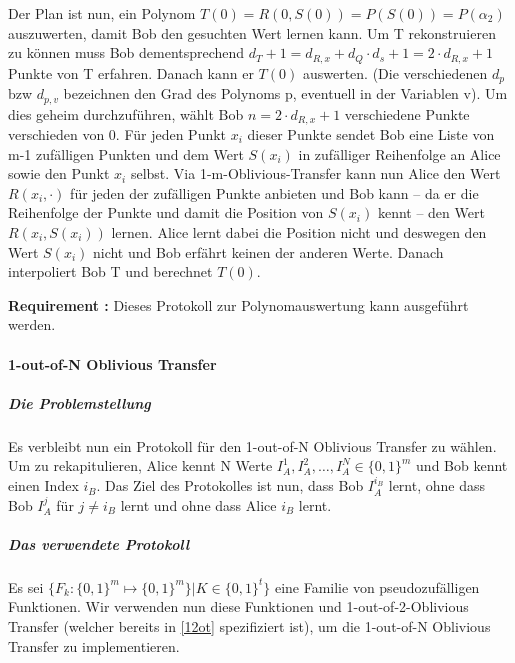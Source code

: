 \documentclass{article}
\newcounter{requirementscount}{}
\newcommand{\requirement}[1] {
        \addtocounter{requirementscount}{1}
        {\bf Requirement \therequirementscount:} #1\\
    }
\begin{document}
Der Plan ist nun, ein Polynom \(T(0) = R(0,S(0)) = P(S(0)) = P(\alpha_2)\)
auszuwerten, damit Bob den gesuchten Wert lernen kann. Um T rekonstruieren
zu k\"onnen muss Bob dementsprechend 
\(d_T + 1 = d_{R,x} + d_Q \cdot d_s +1= 2\cdot d_{R,x}+1\) 
Punkte von T erfahren. Danach kann er \(T(0)\) auswerten. (Die verschiedenen
\(d_p\) bzw \(d_{p,v}\) bezeichnen den Grad des Polynoms p, eventuell in der
Variablen v). Um dies geheim durchzuf\"uhren, w\"ahlt Bob \(n = 2 \cdot d_{R,x}+1\)
verschiedene Punkte verschieden von 0. F\"ur jeden Punkt \(x_i\) dieser Punkte
sendet Bob eine Liste von m-1 zuf\"alligen Punkten und dem Wert \(S(x_i)\) 
in zuf\"alliger Reihenfolge an Alice sowie den Punkt \(x_i\) selbst.
Via 1-m-Oblivious-Transfer kann nun Alice den Wert \(R(x_i, \cdot)\) f\"ur jeden
der zuf\"alligen Punkte anbieten und Bob kann -- da er die Reihenfolge der
Punkte und damit die Position von \(S(x_i)\) kennt -- den Wert \(R(x_i, S(x_i))\)
lernen. Alice lernt dabei die Position nicht und deswegen den Wert \(S(x_i)\)
nicht und Bob erf\"ahrt keinen der anderen Werte. Danach interpoliert Bob T und berechnet 
\(T(0)\).\\
\requirement{Dieses Protokoll zur Polynomauswertung kann ausgef\"uhrt werden.}

\paragraph{1-out-of-N Oblivious Transfer}
\subparagraph{Die Problemstellung}
Es verbleibt nun ein Protokoll f\"ur den 1-out-of-N Oblivious Transfer zu
w\"ahlen. Um zu rekapitulieren, Alice kennt N Werte 
\(I_A^1, I_A^2, \dots, I_A^N \in \{0,1\}^m \)
und Bob kennt einen Index \(i_B\). Das Ziel des Protokolles ist nun, dass Bob
\(I_A^{i_B}\) lernt, ohne dass Bob \(I_A^{j}\) f\"ur \(j \neq i_B\) lernt und
ohne dass Alice \(i_B\) lernt.

\subparagraph{Das verwendete Protokoll}
Es sei \(\{F_k : \{0,1\}^m \mapsto \{0,1\}^m\} | K \in \{0,1\}^t\}\) eine Familie
von pseudozuf\"alligen Funktionen. Wir verwenden nun diese Funktionen und
1-out-of-2-Oblivious Transfer (welcher bereits in \ref{12ot} spezifiziert ist),
um die 1-out-of-N Oblivious Transfer zu implementieren.
\end{document}
